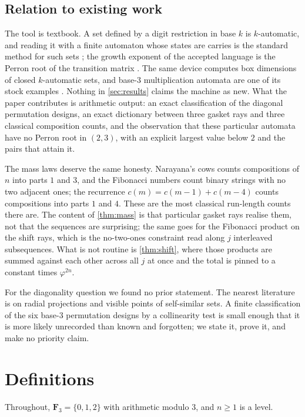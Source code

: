 \documentclass[11pt]{amsart}
\theoremstyle{definition}
\theoremstyle{remark}
\begin{document}
\subsection*{Relation to existing work}

The tool is textbook. A set defined by a digit restriction in base $k$ is $k$-automatic, and reading it with a finite automaton whose states are carries is the standard method for such sets \cite{allouche}; the growth exponent of the accepted language is the Perron root of the transition matrix \cite{seneta}. The same device computes box dimensions of closed $k$-automatic sets, and base-$3$ multiplication automata are one of its stock examples \cite{kauto}. Nothing in \cref{sec:results} claims the machine as new. What the paper contributes is arithmetic output: an exact classification of the diagonal permutation designs, an exact dictionary between three gasket rays and three classical composition counts, and the observation that these particular automata have no Perron root in $(2,3)$, with an explicit largest value below $2$ and the pairs that attain it.

The mass laws deserve the same honesty. Narayana's cows counts compositions of $n$ into parts $1$ and $3$, and the Fibonacci numbers count binary strings with no two adjacent ones; the recurrence $c(m)=c(m-1)+c(m-4)$ counts compositions into parts $1$ and $4$. These are the most classical run-length counts there are. The content of \cref{thm:mass} is that particular gasket rays realise them, not that the sequences are surprising; the same goes for the Fibonacci product on the shift rays, which is the no-two-ones constraint read along $j$ interleaved subsequences. What is not routine is \cref{thm:shift}, where those products are summed against each other across all $j$ at once and the total is pinned to a constant times $\varphi^{2n}$.

For the diagonality question we found no prior statement. The nearest literature is on radial projections and visible points of self-similar sets. A finite classification of the six base-$3$ permutation designs by a collinearity test is small enough that it is more likely unrecorded than known and forgotten; we state it, prove it, and make no priority claim.

\section{Definitions}
\label{sec:defs}

Throughout, $\mathbf{F}_3=\{0,1,2\}$ with arithmetic modulo $3$, and $n\ge 1$ is a level.
\end{document}
